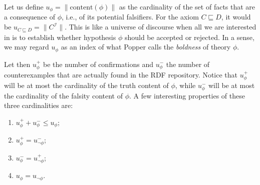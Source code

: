 \documentclass[a4paper]{article}
\newcounter{ex}
\begin{document}
Let us define $u_\phi = \|\mathrm{content}(\phi)\|$ as the cardinality of the
set of facts that are a consequence of $\phi$, i.e., of its potential falsifiers.
For the axiom $C \sqsubseteq D$, it would be $u_{C \sqsubseteq D} = \|C^\mathcal{I}\|$.
This is like a universe of discourse when all we are interested in is to establish
whether hypothesis $\phi$ should be accepted or rejected.
In a sense, we may regard $u_\phi$ as an index of what Popper calls the \emph{boldness}
of theory $\phi$.

Let then $u_\phi^+$ be the number of confirmations and $u_\phi^-$ the number of counterexamples
that are actually found in the RDF repository.
Notice that $u_\phi^+$ will be at most the cardinality of the truth content of $\phi$,
while $u_\phi^-$ will be at most the cardinality of the falsity content of $\phi$.
A few interesting properties of these three cardinalities are:
\begin{enumerate}
\item $u_\phi^+ + u_\phi^- \leq u_\phi$;
\item $u_\phi^+ = u_{\neg\phi}^-$;
\item $u_\phi^- = u_{\neg\phi}^+$;
\item $u_\phi = u_{\neg\phi}$.
\end{enumerate}
\end{document}
